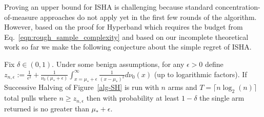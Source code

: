 






Proving an upper bound for ISHA is challenging because standard
concentration-of-measure approaches do not apply yet in the first
few rounds of the algorithm.
However, based on the proof for Hyperband which requires the budget
from Eq.~\ref{eqn:rough_sample_complexity}
and based on our incomplete theoretical work so far we make the
following conjecture about the simple regret of ISHA.
\begin{conjecture}\label{conjecture:main}
Fix $\delta \in (0,1)$. Under some benign assumptions, for any $\epsilon >0$ define
$z_{n,\epsilon}:= \frac{1}{\epsilon^2} + \frac{1}{\nu_0(\mu_* + \epsilon)}\int_{x = \mu_* + \epsilon}^\infty  \frac{1}{(x-\mu_*)^{2}}  d\nu_0(x)$ (up to logarithmic factors).
%
If Successive Halving of Figure~\ref{alg-SH} is run with $n$ arms and $T=\lceil n \log_2(n) \rceil$ total pulls where $n \geq z_{n,\epsilon}$ then with probability at least $1-\delta$ the single arm returned is no greater than $\mu_* +\epsilon$.
\end{conjecture}

